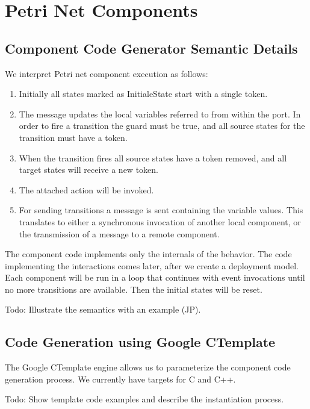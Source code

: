 \section{Petri Net Components}

\subsection{Component Code Generator Semantic Details}

We interpret Petri net component execution as follows:

\begin{enumerate}
\item Initially all states marked as InitialeState start with a single token.
\item The message updates the local variables referred to from within the port.  In order to fire a transition the guard must be true, and all source states for the transition must have a token.
\item When the transition fires all source states have a token removed, and all target states will receive a new token.
\item The attached action will be invoked.
\item For sending transitions a message is sent containing the variable values.  This translates to either a synchronous invocation of another local component, or the transmission of a message to a remote component.
\end{enumerate}

The component code implements only the internals of the behavior.  The code implementing the interactions comes later, after we create a deployment model.   Each component will be run in a loop that continues with event invocations until no more transitions are available.  Then the initial states will be reset.

Todo: Illustrate the semantics with an example (JP).

\subsection{Code Generation using Google CTemplate}

The Google CTemplate engine allows us to parameterize the component code generation process.  We currently have targets for C and C++.

Todo: Show template code examples and describe the instantiation process.

